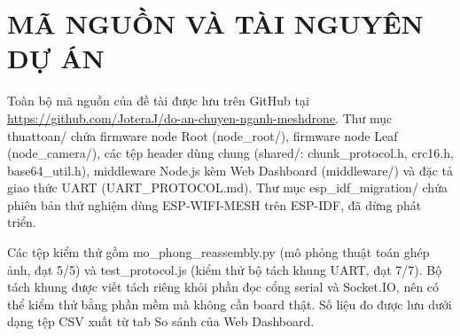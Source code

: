 \chapter{MÃ NGUỒN VÀ TÀI NGUYÊN DỰ ÁN}\label{app:a}
Toàn bộ mã nguồn của đề tài được lưu trên GitHub tại \url{https://github.com/JoteraJ/do-an-chuyen-nganh-meshdrone}. Thư mục thuattoan/ chứa firmware node Root (node\_root/), firmware node Leaf (node\_camera/), các tệp header dùng chung (shared/: chunk\_protocol.h, crc16.h, base64\_util.h), middleware Node.js kèm Web Dashboard (middleware/) và đặc tả giao thức UART (UART\_PROTOCOL.md). Thư mục esp\_idf\_migration/ chứa phiên bản thử nghiệm dùng ESP-WIFI-MESH trên ESP-IDF, đã dừng phát triển.

Các tệp kiểm thử gồm mo\_phong\_reassembly.py (mô phỏng thuật toán ghép ảnh, đạt 5/5) và test\_protocol.js (kiểm thử bộ tách khung UART, đạt 7/7). Bộ tách khung được viết tách riêng khỏi phần đọc cổng serial và Socket.IO, nên có thể kiểm thử bằng phần mềm mà không cần board thật. Số liệu đo được lưu dưới dạng tệp CSV xuất từ tab So sánh của Web Dashboard.

